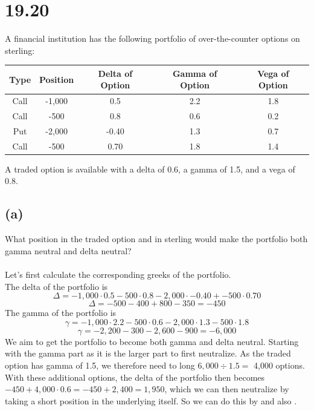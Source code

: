 \documentclass{article}
\begin{document}
{\Large 

\section*{19.20}
A financial institution has the following portfolio of over-the-counter options on sterling:

\begin{center}
\begin{tabular}{ |c|c|c|c|c| } 
 \hline
 Type & Position & Delta of Option & Gamma of Option & Vega of Option \\ 
 \hline
 Call & -1,000 & 0.5 & 2.2 & 1.8 \\ 
 \hline
 Call & -500 & 0.8 & 0.6 & 0.2 \\ 
 \hline
 Put & -2,000 & -0.40 & 1.3 & 0.7 \\ 
 \hline
 Call & -500 & 0.70 & 1.8 & 1.4 \\ 
 \hline
\end{tabular}
\end{center}
A traded option is available with a delta of 0.6, a gamma of 1.5, and a vega of 0.8.

\subsection*{(a)} 
What position in the traded option and in sterling would make the portfolio both gamma neutral and delta neutral? \\ \\
Let's first calculate the corresponding greeks of the portfolio. \\
The delta of the portfolio is 
\[
  \Delta = -1,000 \cdot 0.5 - 500 \cdot 0.8 - 2,000 \cdot -0.40 + -500 \cdot 0.70
\]
\[
  \Delta = -500 - 400 + 800 - 350 = -450
\]
The gamma of the portfolio is 
\[
  \gamma = -1,000 \cdot 2.2 - 500 \cdot 0.6 - 2,000 \cdot 1.3 - 500 \cdot 1.8
\]
\[
  \gamma = -2,200 - 300 - 2,600 - 900 = -6,000
\]
We aim to get the portfolio to become both gamma and delta neutral. Starting with the gamma part as it is the larger part to first neutralize. As the traded option has gamma of 1.5, we therefore need to long \(6,000 \div 1.5 = \) 4,000 options. With these additional options, the delta of the portfolio then becomes \(-450 + 4,000 \cdot 0.6 = -450 + 2,400 = 1,950\), which we can then neutralize by taking a short position in the underlying itself. So we can do this by  and also .

}
\end{document}
